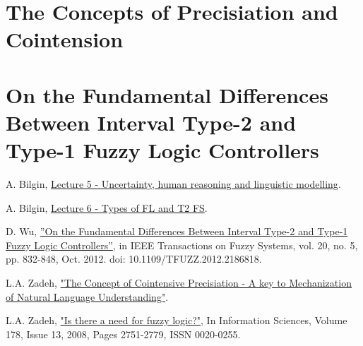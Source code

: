 \documentclass[11pt]{article}
\begin{document}
\section{The Concepts of Precisiation and Cointension}



\newpage
\section{On the Fundamental Differences Between Interval Type-2 and Type-1 Fuzzy Logic Controllers}


\begin{thebibliography}{9}

    A. Bilgin,
    \href{https://drive.google.com/uc?id=1j505Rpb5mCb6EVXmwBEv5caM-nmYwecJ&authuser=0&export=download}{Lecture 5 - Uncertainty, human reasoning and linguistic modelling}.

    A. Bilgin,
    \href{https://drive.google.com/uc?id=1cKJrc8KOdRhiMGHUycb2IEiU2ZFiOgsZ&authuser=0&export=download}{Lecture 6 - Types of FL and T2 FS}.

    D. Wu,
    \href{http://ieeexplore.ieee.org/stamp/stamp.jsp?arnumber=6145645}{”On the Fundamental Differences Between Interval Type-2 and Type-1 Fuzzy Logic Controllers”}, in IEEE Transactions on Fuzzy Systems, vol. 20, no. 5, pp. 832-848, Oct. 2012. doi: 10.1109/TFUZZ.2012.2186818.

    L.A. Zadeh,
    \href{http://www.math.s.chiba-u.ac.jp/~yasuda/open2all/Paris06/IPMU2006/HTML/FINALPAPERS/P703.PDF}{"The Concept of Cointensive Precisiation - A key to Mechanization of Natural Language Understanding"}.

    L.A. Zadeh,
    \href{http://www.sciencedirect.com/science/article/pii/S0020025508000716}{"Is there a need for fuzzy logic?"}, In Information Sciences, Volume 178, Issue 13, 2008, Pages 2751-2779, ISSN 0020-0255.

\end{thebibliography}
\end{document}
